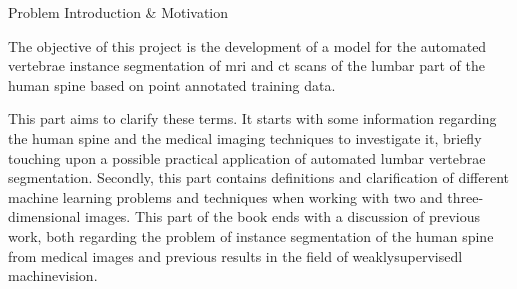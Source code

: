 \begin{partwithabstract}{Problem Introduction \& Motivation}
    \par{
        The objective of this project is the development of a model for the automated vertebrae instance segmentation of \acrshort{mri} and \acrshort{ct} scans of the lumbar part of the human spine based on point annotated training data.
    }
    \par{
        This part aims to clarify these terms. 
        It starts with some information regarding the human spine and the medical imaging techniques to investigate it, briefly touching upon a possible practical application of automated lumbar vertebrae segmentation.
        Secondly, this part contains definitions and clarification of different machine learning problems and techniques when working with two and three-dimensional images.
        This part of the book ends with a discussion of previous work, both regarding the problem of instance segmentation of the human spine from medical images and previous results in the field of \Gls{weaklysupervisedl} \Gls{machinevision}.
    }
\end{partwithabstract}

\restoregeometry



